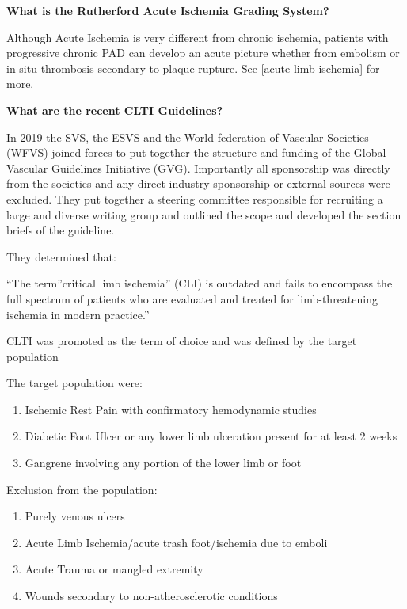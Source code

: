 \documentclass[
]{book}
\begin{document}
\textbf{What is the Rutherford Acute Ischemia Grading System?}

Although Acute Ischemia is very different from chronic ischemia,
patients with progressive chronic PAD can develop an acute picture
whether from embolism or in-situ thrombosis secondary to plaque rupture.
See \ref{acute-limb-ischemia} for more.

\textbf{What are the recent CLTI Guidelines?}

In 2019 the SVS, the ESVS and the World federation of Vascular Societies
(WFVS) joined forces to put together the structure and funding of the
Global Vascular Guidelines Initiative (GVG). Importantly all sponsorship
was directly from the societies and any direct industry sponsorship or
external sources were excluded. They put together a steering committee
responsible for recruiting a large and diverse writing group and
outlined the scope and developed the section briefs of the guideline.

They determined that:

``The term''critical limb ischemia'' (CLI) is outdated and fails to
encompass the full spectrum of patients who are evaluated and treated
for limb-threatening ischemia in modern practice.''

CLTI was promoted as the term of choice and was defined by the target
population

The target population were:

\begin{enumerate}
\def\labelenumi{\arabic{enumi}.}
\item
  Ischemic Rest Pain with confirmatory hemodynamic studies
\item
  Diabetic Foot Ulcer or any lower limb ulceration present for at
  least 2 weeks
\item
  Gangrene involving any portion of the lower limb or foot
\end{enumerate}

Exclusion from the population:

\begin{enumerate}
\def\labelenumi{\arabic{enumi}.}
\item
  Purely venous ulcers
\item
  Acute Limb Ischemia/acute trash foot/ischemia due to emboli
\item
  Acute Trauma or mangled extremity
\item
  Wounds secondary to non-atherosclerotic conditions
\end{enumerate}
\end{document}
